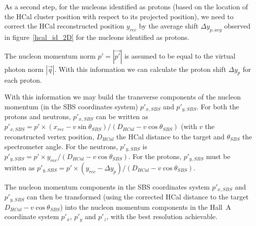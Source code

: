\documentclass[11pt]{article}
\begin{document}
As a second step, for the nucleons identified as protons (based on the location of the HCal cluster position with respect to its projected position), we need to correct the HCal reconstructed position $y_{rec}$ by the average shift $\Delta y_{p, avg}$ observed in figure~\ref{hcal_id_2D} for the nucleons identified as protons.

The nucleon momentum norm $p' = |\vec{p'}|$ is assumed to be equal to the virtual photon norm $|\vec{q}|$.
With this information we can calculate the proton shift $\Delta y_{p}$ for each proton.

With this information we may build the transverse components of the nucleon momentum (in the SBS coordinates system) $p'_{x, SBS}$ and $p'_{y, SBS}$.
For both the protons and neutrons, $p'_{x, SBS}$ can be written as $p'_{x, SBS} = p' \times (x_{rec}-v\sin{\theta_{SBS}})/(D_{HCal}-v\cos{\theta_{SBS}})$ (with $v$ the reconstructed vertex position, $D_{HCal}$ the HCal distance to the target and $\theta_{SBS}$ the spectrometer angle.
For the neutrons, $p'_{y, SBS}$ is $p'_{y, SBS} = p' \times y_{rec}/(D_{HCal}-v\cos{\theta_{SBS}})$.
For the protons, $p'_{y, SBS}$ must be written as $p'_{y, SBS} = p' \times (y_{rec} - \Delta y_{p})/(D_{HCal}-v\cos{\theta_{SBS}})$.

The nucleon momentum components in the SBS coordinates system $p'_{x, SBS}$ and $p'_{y, SBS}$ can then be transformed (using the corrected HCal distance to the target $D_{HCal}-v\cos{\theta_{SBS}}$) into the nucleon momentum components in the Hall~A coordinate system $p'_{x}$, $p'_y$ and $p'_z$, with the best resolution achievable. 
\end{document}
